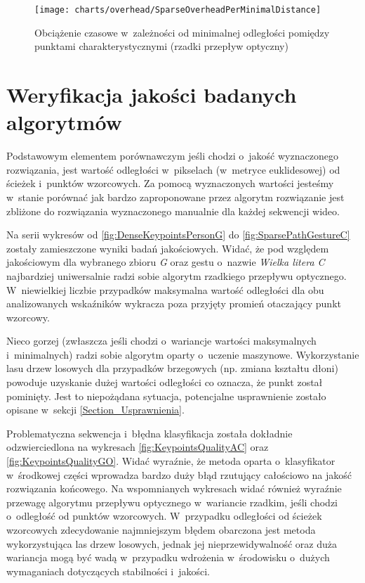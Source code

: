    \newpage
      \begin{figure}[!ht]
        \centering
        \texttt{[image: charts/overhead/SparseOverheadPerMinimalDistance]}
        \caption[Obciążenie czasowe w~zależności od minimalnej odległości pomiędzy punktami charakterystycznymi]
                {Obciążenie czasowe w~zależności od minimalnej odległości pomiędzy punktami charakterystycznymi (rzadki przepływ optyczny)}
        \label{fig:SpecialisedSparseOverhead}
      \end{figure}

  \section{Weryfikacja jakości badanych algorytmów}\label{Section_Quality}

    Podstawowym elementem porównawczym jeśli chodzi o~jakość wyznaczonego rozwiązania, jest wartość odległości w~pikselach (w~metryce euklidesowej) od ścieżek i~punktów wzorcowych. Za pomocą wyznaczonych wartości jesteśmy w~stanie porównać jak bardzo zaproponowane przez algorytm rozwiązanie jest zbliżone do rozwiązania wyznaczonego manualnie dla każdej sekwencji wideo.

    Na serii wykresów od \ref{fig:DenseKeypointsPersonG} do \ref{fig:SparsePathGestureC} zostały zamieszczone wyniki badań jakościowych. Widać, że pod względem jakościowym dla wybranego zbioru \textit{G} oraz gestu o~nazwie \textit{Wielka litera C} najbardziej uniwersalnie radzi sobie algorytm rzadkiego przepływu optycznego. W~niewielkiej liczbie przypadków maksymalna wartość odległości dla obu analizowanych wskaźników wykracza poza przyjęty promień otaczający punkt wzorcowy.

    Nieco gorzej (zwłaszcza jeśli chodzi o~wariancje wartości maksymalnych i~minimalnych) radzi sobie algorytm oparty o~uczenie maszynowe. Wykorzystanie lasu drzew losowych dla przypadków brzegowych (np. zmiana kształtu dłoni) powoduje uzyskanie dużej wartości odległości co oznacza, że punkt został pominięty. Jest to niepożądana sytuacja, potencjalne usprawnienie zostało opisane w~sekcji \ref{Section_Usprawnienia}.

    Problematyczna sekwencja i~błędna klasyfikacja została dokładnie odzwierciedlona na wykresach \ref{fig:KeypointsQualityAC} oraz \ref{fig:KeypointsQualityGO}. Widać wyraźnie, że metoda oparta o~klasyfikator w~środkowej części wprowadza bardzo duży błąd rzutujący całościowo na jakość rozwiązania końcowego. Na wspomnianych wykresach widać również wyraźnie przewagę algorytmu przepływu optycznego w~wariancie rzadkim, jeśli chodzi o~odległość od punktów wzorcowych. W~przypadku odległości od ścieżek wzorcowych zdecydowanie najmniejszym błędem obarczona jest metoda wykorzystująca las drzew losowych, jednak jej nieprzewidywalność oraz duża wariancja mogą być wadą w~przypadku wdrożenia w~środowisku o~dużych wymaganiach dotyczących stabilności i~jakości.

